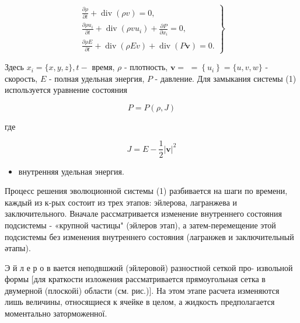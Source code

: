 \documentclass[10pt]{article}
\begin{document}
\[

\left.\begin{array}{l}

\frac{\partial \rho}{\partial t}+\operatorname{div}(\rho v)=0, \\

\frac{\partial \rho u_{i}}{\partial t}+\operatorname{div}\left(\rho v u_{i}\right)+\frac{\partial P}{\partial x_{i}}=0, \\

\frac{\partial \rho E}{\partial t}+\operatorname{div}(\rho E v)+\operatorname{div}(P \boldsymbol{v})=0 .

\end{array}\right\}

\]



Здесь $x_{i}=\{x, y, z\}, t-$ время, $\rho$ - плотность, $\boldsymbol{v}=$ $=\left\{u_{i}\right\}=\{u, v, w\}$ - скорость, $E$ - полная удельная энергия, $P$ - давление. Для замыкания системы (1) используется уравнение состояния



\[

P=P(\rho, J)

\]



где



\[

J=E-\frac{1}{2}|\boldsymbol{v}|^{2}

\]



\begin{itemize}

  \item внутренняя удельная энергия.

\end{itemize}



Процесс решения эволюционной системы (1) разбивается на шаги по времени, каждый из к-рых состоит из трех этапов: эйлерова, лагранжева и заключительного. Вначале рассматривается изменение внутреннего состояния подсистемы - «крупной частицы" (эйлеров этап), а затем-перемещение этой подсистемы без изменения внутреннего состояния (лагранжев и заключительный әтапы).



Э й л е р о в вается неподвшжнй (эйлеровой) разностной сеткой про- извольной формы [для краткости изложения рассматривается прямоугольная сетка в двумерной (плоскойі) области (см. рис.)]. На этом этапе расчета изменяются лишь величины, относящиеся к ячейке в целом, а жидкость предполагается моментально заторможенної.
\end{document}
